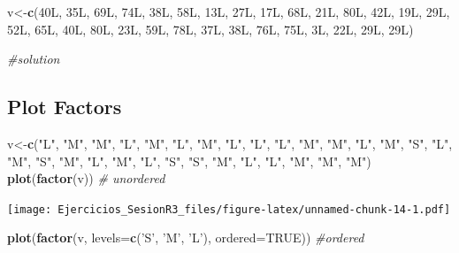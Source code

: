\documentclass[
]{article}
\newenvironment{Shaded}{\begin{snugshade}}{\end{snugshade}}
\newcommand{\CommentTok}[1]{\textcolor[rgb]{0.56,0.35,0.01}{\textit{#1}}}
\newcommand{\DataTypeTok}[1]{\textcolor[rgb]{0.13,0.29,0.53}{#1}}
\newcommand{\KeywordTok}[1]{\textcolor[rgb]{0.13,0.29,0.53}{\textbf{#1}}}
\newcommand{\NormalTok}[1]{#1}
\newcommand{\OtherTok}[1]{\textcolor[rgb]{0.56,0.35,0.01}{#1}}
\newcommand{\StringTok}[1]{\textcolor[rgb]{0.31,0.60,0.02}{#1}}
\begin{document}
\begin{Shaded}
\begin{Highlighting}[]
\NormalTok{v<-}\KeywordTok{c}\NormalTok{(40L, 35L, 69L, 74L, 38L, 58L, 13L, 27L, 17L, 68L, 21L, 80L, }
\NormalTok{42L, 19L, 29L, 52L, 65L, 40L, 80L, 23L, 59L, 78L, 37L, 38L, 76L, }
\NormalTok{75L, 3L, 22L, 29L, 29L)}

\CommentTok{#solution}
\end{Highlighting}
\end{Shaded}

\hypertarget{plot-factors}{%
\subsection{Plot Factors}\label{plot-factors}}

\begin{Shaded}
\begin{Highlighting}[]
\NormalTok{v<-}\KeywordTok{c}\NormalTok{(}\StringTok{"L"}\NormalTok{, }\StringTok{"M"}\NormalTok{, }\StringTok{"M"}\NormalTok{, }\StringTok{"L"}\NormalTok{, }\StringTok{"M"}\NormalTok{, }\StringTok{"L"}\NormalTok{, }\StringTok{"M"}\NormalTok{, }\StringTok{"L"}\NormalTok{, }\StringTok{"L"}\NormalTok{, }\StringTok{"L"}\NormalTok{, }\StringTok{"M"}\NormalTok{, }\StringTok{"M"}\NormalTok{, }
\StringTok{"L"}\NormalTok{, }\StringTok{"M"}\NormalTok{, }\StringTok{"S"}\NormalTok{, }\StringTok{"L"}\NormalTok{, }\StringTok{"M"}\NormalTok{, }\StringTok{"S"}\NormalTok{, }\StringTok{"M"}\NormalTok{, }\StringTok{"L"}\NormalTok{, }\StringTok{"M"}\NormalTok{, }\StringTok{"L"}\NormalTok{, }\StringTok{"S"}\NormalTok{, }\StringTok{"S"}\NormalTok{, }\StringTok{"M"}\NormalTok{, }
\StringTok{"L"}\NormalTok{, }\StringTok{"L"}\NormalTok{, }\StringTok{"M"}\NormalTok{, }\StringTok{"M"}\NormalTok{, }\StringTok{"M"}\NormalTok{)}
\KeywordTok{plot}\NormalTok{(}\KeywordTok{factor}\NormalTok{(v)) }\CommentTok{# unordered}
\end{Highlighting}
\end{Shaded}

\texttt{[image: Ejercicios\_SesionR3\_files/figure-latex/unnamed-chunk-14-1.pdf]}

\begin{Shaded}
\begin{Highlighting}[]
\KeywordTok{plot}\NormalTok{(}\KeywordTok{factor}\NormalTok{(v, }\DataTypeTok{levels=}\KeywordTok{c}\NormalTok{(}\StringTok{'S'}\NormalTok{, }\StringTok{'M'}\NormalTok{, }\StringTok{'L'}\NormalTok{), }\DataTypeTok{ordered=}\OtherTok{TRUE}\NormalTok{)) }\CommentTok{#ordered}
\end{Highlighting}
\end{Shaded}
\end{document}
